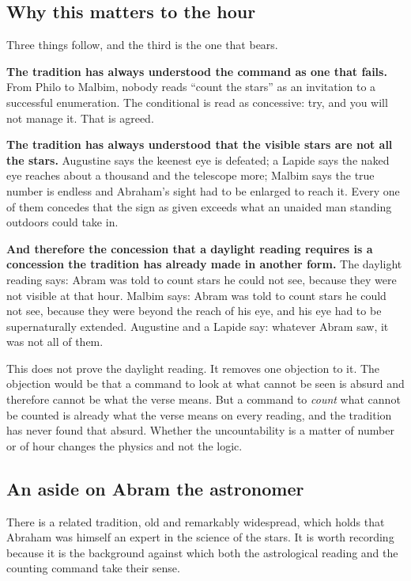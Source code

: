 \subsection{Why this matters to the hour}

Three things follow, and the third is the one that bears.

\textbf{The tradition has always understood the command as one that fails.} From
Philo to Malbim, nobody reads ``count the stars'' as an invitation to a
successful enumeration. The conditional is read as concessive: try, and you will
not manage it. That is agreed.

\textbf{The tradition has always understood that the visible stars are not all
the stars.} Augustine says the keenest eye is defeated; a Lapide says the naked
eye reaches about a thousand and the telescope more; Malbim says the true number
is endless and Abraham's sight had to be enlarged to reach it. Every one of them
concedes that the sign as given exceeds what an unaided man standing outdoors
could take in.

\textbf{And therefore the concession that a daylight reading requires is a
concession the tradition has already made in another form.} The daylight reading
says: Abram was told to count stars he could not see, because they were not
visible at that hour. Malbim says: Abram was told to count stars he could not
see, because they were beyond the reach of his eye, and his eye had to be
supernaturally extended. Augustine and a Lapide say: whatever Abram saw, it was
not all of them.

This does not prove the daylight reading. It removes one objection to it. The
objection would be that a command to look at what cannot be seen is absurd and
therefore cannot be what the verse means. But a command to \emph{count} what
cannot be counted is already what the verse means on every reading, and the
tradition has never found that absurd. Whether the uncountability is a matter of
number or of hour changes the physics and not the logic.

\subsection{An aside on Abram the astronomer}

There is a related tradition, old and remarkably widespread, which holds that
Abraham was himself an expert in the science of the stars. It is worth recording
because it is the background against which both the astrological reading and the
counting command take their sense.

